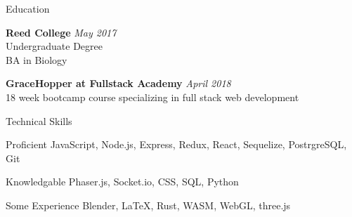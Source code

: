 \documentclass{resume} %
\begin{document}
    
    
    \begin{rSection}{Education}
    
    {\bf Reed College} \hfill {\em May 2017} 
    \\ Undergraduate Degree
    \\ BA in Biology 

    {\bf GraceHopper at Fullstack Academy} \hfill {\em April 2018} 
    \\ 18 week bootcamp course specializing in full stack web development  
    
    
    \end{rSection}
    
    \begin{rSection}{Technical Skills}
    
    {Proficient} \hspace{10ex} {{ JavaScript},{ Node.js}, { Express},{ Redux},{ React},
    { Sequelize},{ PostrgreSQL},{ Git}}
    
    {Knowledgable} \hspace{6ex} {{ Phaser.js},{ Socket.io},{ CSS},{ SQL}, {Python}{}}

    {Some Experience} \hspace{4ex} {{Blender}, \LaTeX,{ Rust}, { WASM},{ WebGL},{ three.js}}
    


    \end{rSection}
    
\end{document}
